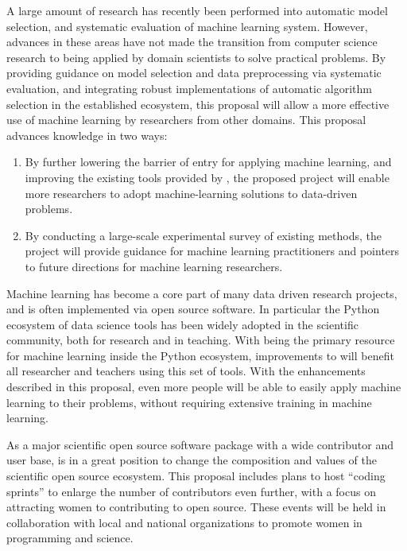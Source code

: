 A large amount of research has recently been performed into automatic model
selection, and systematic evaluation of machine learning system.
However, advances in these areas have not made the transition from computer
science research to being applied by domain scientists to solve practical
problems.
By providing guidance on model selection and data preprocessing via
systematic evaluation, and integrating robust implementations of automatic
algorithm selection in the established \sklearn{} ecosystem, this proposal
will allow a more effective use of machine learning by researchers from other domains.
%
\vspace{-3mm}
\vspace{-3mm}
This proposal advances knowledge in two ways:
\begin{enumerate}
    \item By further lowering the barrier of entry for applying machine
        learning, and improving the existing tools provided by \sklearn{}, the
        proposed project will enable more researchers to adopt machine-learning
        solutions to data-driven problems.
    \item By conducting a large-scale experimental survey of existing methods,
        the project will provide guidance for machine learning practitioners
        and pointers to future directions for machine learning researchers.
\end{enumerate}
%
\vspace{-6mm}
\vspace{-3mm}
Machine learning has become a core part of many data driven research projects,
and is often implemented via open source software.
In particular the Python ecosystem of data science tools has been widely
adopted in the scientific community, both for research and in teaching.
With \sklearn{} being the primary resource for machine learning inside
the Python ecosystem, improvements to \sklearn{} will benefit all researcher
and teachers using this set of tools.
With the enhancements described in this proposal, even more people
will be able to easily apply machine learning to their problems,
without requiring extensive training in machine learning.

As a major scientific open source software package with a wide contributor
and user base, \sklearn{} is in a great position to change
the composition and values of the scientific open source ecosystem.
This proposal includes plans to host ``coding sprints'' to enlarge the number
of contributors even further, with a focus on attracting women to contributing
to open source. These events will be held in collaboration with local and
national organizations to promote women in programming and science.
